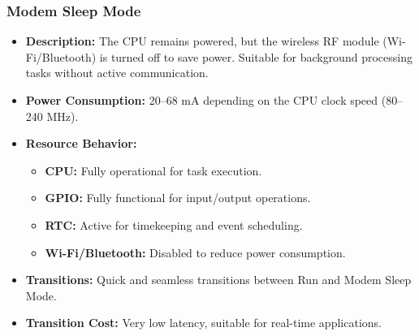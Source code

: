 \documentclass[a4paper, 11pt]{article}
\begin{document}
    \subsubsection*{Modem Sleep Mode}
    \begin{itemize}
        \item \textbf{Description:} The CPU remains powered, but the wireless RF module (Wi-Fi/Bluetooth) is turned off to save power. Suitable for background processing tasks without active communication.
        \item \textbf{Power Consumption:} 20–68 mA depending on the CPU clock speed (80–240 MHz).
        \item \textbf{Resource Behavior:}
        \begin{itemize}
            \item \textbf{CPU:} Fully operational for task execution.
            \item \textbf{GPIO:} Fully functional for input/output operations.
            \item \textbf{RTC:} Active for timekeeping and event scheduling.
            \item \textbf{Wi-Fi/Bluetooth:} Disabled to reduce power consumption.
        \end{itemize}
        \item \textbf{Transitions:} Quick and seamless transitions between Run and Modem Sleep Mode.
        \item \textbf{Transition Cost:} Very low latency, suitable for real-time applications.
    \end{itemize}
    
\end{document}
